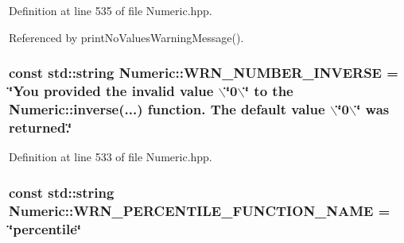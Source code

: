 \-Definition at line 535 of file \-Numeric.\-hpp.



\-Referenced by print\-No\-Values\-Warning\-Message().

\hypertarget{classmultiscale_1_1Numeric_ac1e4755ec54d2c04217d0d1f4b5d346b}{
\subsubsection[{\-W\-R\-N\-\_\-\-N\-U\-M\-B\-E\-R\-\_\-\-I\-N\-V\-E\-R\-S\-E}]{\setlength{\rightskip}{0pt plus 5cm}const std\-::string {\bf \-Numeric\-::\-W\-R\-N\-\_\-\-N\-U\-M\-B\-E\-R\-\_\-\-I\-N\-V\-E\-R\-S\-E} = \char`\"{}\-You provided the invalid value $\backslash$\char`\"{}0$\backslash$\char`\"{} to the \-Numeric\-::inverse(...) function. \-The default value $\backslash$\char`\"{}0$\backslash$\char`\"{} was returned.\char`\"{}}}\label{classmultiscale_1_1Numeric_ac1e4755ec54d2c04217d0d1f4b5d346b}


\-Definition at line 533 of file \-Numeric.\-hpp.

\hypertarget{classmultiscale_1_1Numeric_a8d81f8548808bc79d7a63913866d848f}{
\subsubsection[{\-W\-R\-N\-\_\-\-P\-E\-R\-C\-E\-N\-T\-I\-L\-E\-\_\-\-F\-U\-N\-C\-T\-I\-O\-N\-\_\-\-N\-A\-M\-E}]{\setlength{\rightskip}{0pt plus 5cm}const std\-::string {\bf \-Numeric\-::\-W\-R\-N\-\_\-\-P\-E\-R\-C\-E\-N\-T\-I\-L\-E\-\_\-\-F\-U\-N\-C\-T\-I\-O\-N\-\_\-\-N\-A\-M\-E} = \char`\"{}percentile\char`\"{}}}\label{classmultiscale_1_1Numeric_a8d81f8548808bc79d7a63913866d848f}


